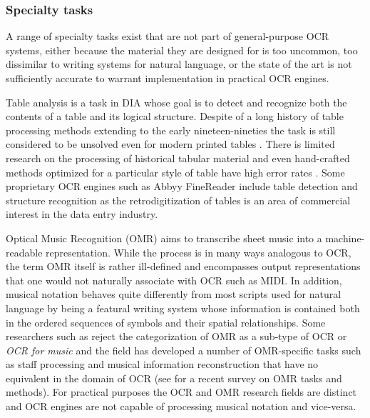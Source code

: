 \subsubsection{Specialty tasks}

A range of specialty tasks exist that are not part of general-purpose OCR
systems, either because the material they are designed for is too uncommon, too
dissimilar to writing systems for natural language, or the state of the art is
not sufficiently accurate to warrant implementation in practical OCR engines.

Table analysis is a task in DIA whose goal is to detect and recognize both the
contents of a table and its logical structure. Despite of a long history of
table processing methods extending to the early nineteen-nineties
\cite{zanibbi2004survey} the task is still considered to be unsolved even for
modern printed tables \cite{gao2019icdar}. There is limited research on the
processing of historical tabular material and even hand-crafted methods
optimized for a particular style of table have high error rates
\cite{lehenmeier2020layout}. Some proprietary OCR engines such as Abbyy
FineReader include table detection and structure recognition as the
retrodigitization of tables is an area of commercial interest in the data entry
industry.

Optical Music Recognition (OMR) aims to transcribe sheet music into a
machine-readable representation. While the process is in many ways analogous to
OCR, the term OMR itself is rather ill-defined and encompasses output
representations that one would not naturally associate with OCR such as MIDI.
In addition, musical notation behaves quite differently from most scripts used
for natural language by being a featural writing system whose information is
contained both in the ordered sequences of symbols and their spatial
relationships. Some researchers such as \cite{calvo2020understanding} reject
the categorization of OMR as a sub-type of OCR or \emph{OCR for music} and the
field has developed a number of OMR-specific tasks such as staff processing and
musical information reconstruction that have no equivalent in the domain of OCR
(see \cite{shatri2020optical} for a recent survey on OMR tasks and methods).
For practical purposes the OCR and OMR research fields are distinct and OCR
engines are not capable of processing musical notation and vice-versa.

